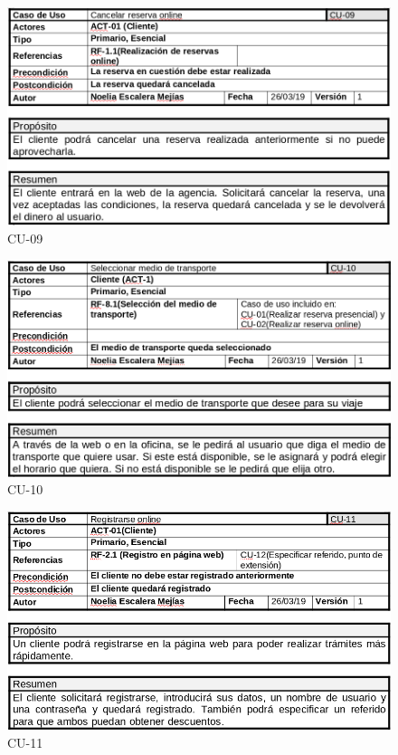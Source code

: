 \documentclass{article}
\begin{document}
	\begin{figure}[H]
		\centering
		\includegraphics[totalheight=8.5cm]{cu-09}
		\caption{CU-09}
		\label{fig:cu-09}
	\end{figure}

	\begin{figure}[H]
		\centering
		\includegraphics[totalheight=8.5cm]{cu-10}
		\caption{CU-10}
		\label{fig:cu-10}
	\end{figure}

	\begin{figure}[H]
		\centering
		\includegraphics[totalheight=8cm]{cu-11}
		\caption{CU-11}
		\label{fig:cu-11}
	\end{figure}
\end{document}
